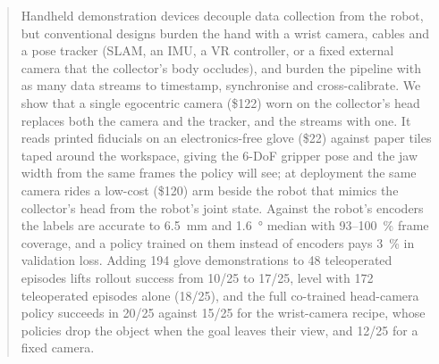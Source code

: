 \begin{abstract}
Handheld demonstration devices decouple data collection from the robot, but conventional designs burden the hand with a wrist camera, cables and a pose tracker (SLAM, an IMU, a VR controller, or a fixed external camera that the collector's body occludes), and burden the pipeline with as many data streams to timestamp, synchronise and cross-calibrate. We show that a single egocentric camera (\$122) worn on the collector's head replaces both the camera and the tracker, and the streams with one. It reads printed fiducials on an electronics-free glove (\$22) against paper tiles taped around the workspace, giving the 6-DoF gripper pose and the jaw width from the same frames the policy will see; at deployment the same camera rides a low-cost (\$120) arm beside the robot that mimics the collector's head from the robot's joint state. Against the robot's encoders the labels are accurate to \SI{6.5}{mm} and \SI{1.6}{\degree} median with \SI{93}{}--\SI{100}{\percent} frame coverage, and a policy trained on them instead of encoders pays \SI{3}{\percent} in validation loss. Adding 194 glove demonstrations to 48 teleoperated episodes lifts rollout success from 10/25 to 17/25, level with 172 teleoperated episodes alone (18/25), and the full co-trained head-camera policy succeeds in 20/25 against 15/25 for the wrist-camera recipe, whose policies drop the object when the goal leaves their view, and 12/25 for a fixed camera.
\end{abstract}
